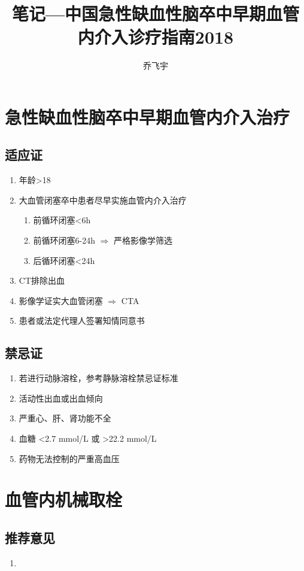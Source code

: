 \documentclass{ctexart}
\title{笔记---中国急性缺血性脑卒中早期血管内介入诊疗指南2018}
\begin{document}
\author{乔飞宇}

\maketitle

\section{急性缺血性脑卒中早期血管内介入治疗}

	\subsection{适应证}
		\begin{enumerate}
			\item 年龄>18
			\item 大血管闭塞卒中患者尽早实施血管内介入治疗
			\begin{enumerate}
				\item 前循环闭塞<6h
				\item 前循环闭塞6-24h $\Rightarrow$ 严格影像学筛选
				\item 后循环闭塞<24h
			\end{enumerate}
			\item CT排除出血
			\item 影像学证实大血管闭塞 $\Rightarrow$ CTA
			\item 患者或法定代理人签署知情同意书
		\end{enumerate}
	
	\subsection{禁忌证}
		\begin{enumerate}
			\item 若进行动脉溶栓，参考静脉溶栓禁忌证标准
			\item 活动性出血或出血倾向
			\item 严重心、肝、肾功能不全
			\item 血糖 <2.7 mmol/L 或 >22.2 mmol/L
			\item 药物无法控制的严重高血压
		\end{enumerate}

\section{血管内机械取栓}

	\subsection{推荐意见}
		\begin{enumerate}
			\item 
		\end{enumerate}
\end{document}

